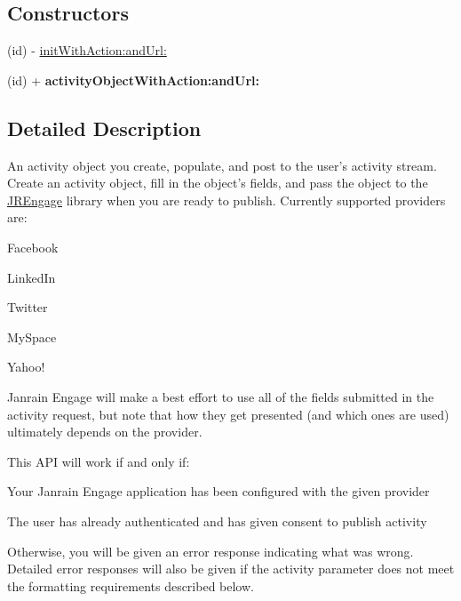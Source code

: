 \subsection*{Constructors}
\label{_amgrp559a25fdb98a7d1fd1c3771ac568d5e9}
 \begin{DoxyCompactItemize}
\item 
(id) -\/ \hyperlink{interface_j_r_activity_object_a61195dc95162d1136d41af3a5f15fe2d}{initWithAction:andUrl:}
\item 
\hypertarget{interface_j_r_activity_object_a7bfe16e0799ff6c07548ef8aeb778a51}{
(id) + {\bfseries activityObjectWithAction:andUrl:}}
\label{interface_j_r_activity_object_a7bfe16e0799ff6c07548ef8aeb778a51}

\end{DoxyCompactItemize}


\subsection{Detailed Description}
An activity object you create, populate, and post to the user's activity stream. Create an activity object, fill in the object's fields, and pass the object to the \hyperlink{class_j_r_engage}{JREngage} library when you are ready to publish. Currently supported providers are:
\begin{DoxyItemize}
\item Facebook
\item LinkedIn
\item Twitter
\item MySpace
\item Yahoo!
\end{DoxyItemize}

Janrain Engage will make a best effort to use all of the fields submitted in the activity request, but note that how they get presented (and which ones are used) ultimately depends on the provider.

This API will work if and only if:
\begin{DoxyItemize}
\item Your Janrain Engage application has been configured with the given provider
\item The user has already authenticated and has given consent to publish activity
\end{DoxyItemize}

Otherwise, you will be given an error response indicating what was wrong. Detailed error responses will also be given if the activity parameter does not meet the formatting requirements described below.

